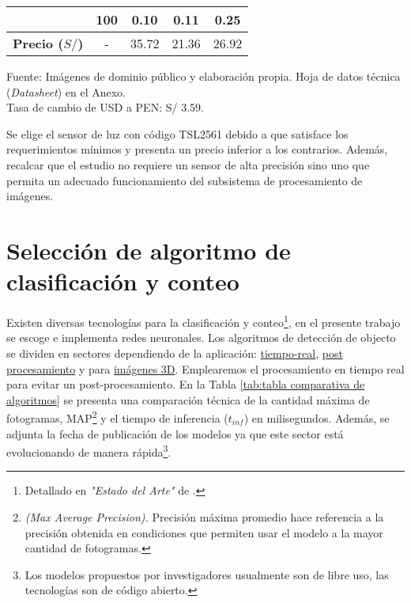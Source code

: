 \begin{savenotes}
\begin{mytable}[H]
\begin{tabular}{l|c|c|c|c|}
{			} & 100 & 0.10 & 0.11 & 0.25 \\ \hline
			\multicolumn{1}{|l|}{
				\begin{minipage}{\myforthmaxsizeofcontenttable}	
					\textbf{Precio ($S/$)}
				\end{minipage}
			} & - & 35.72 & 21.36 & 26.92 \\ \hline
		\end{tabular}
		\begin{myflushcenteraftertable}	
			Fuente: Imágenes de dominio público y elaboración propia. Hoja de datos técnica (\textit{Datasheet}) en el Anexo.\\
			Tasa de cambio de USD a PEN: S/ 3.59.
		\end{myflushcenteraftertable}
	\end{mytable}
\end{savenotes}

Se elige el sensor de luz con código TSL2561 debido a que satisface los requerimientos mínimos y presenta un precio inferior a los contrarios. Además, recalcar que el estudio no requiere un sensor de alta precisión sino uno que permita un adecuado funcionamiento del subsistema de procesamiento de imágenes.

\section{Selección de algoritmo de clasificación y conteo}
\label{sssec:seleccion de algoritmo de clasificacion y conteo}

Existen diversas tecnologías para la clasificación y conteo\footnote{Detallado en \textit{"Estado del Arte"} de \cite{DiazVergara2020}.}, en el presente trabajo se escoge e implementa redes neuronales. Los algoritmos de detección de objecto se dividen en sectores dependiendo de la aplicación: \href{https://paperswithcode.com/sota/real-time-object-detection-on-coco}{tiempo-real}, \href{https://paperswithcode.com/sota/object-detection-on-coco}{post procesamiento} y para \href{https://paperswithcode.com/sota/3d-object-detection-on-kitti-cars-moderate}{imágenes 3D}. Emplearemos el procesamiento en tiempo real para evitar un post-procesamiento. En la Tabla \ref{tab:tabla comparativa de algoritmos} se presenta una comparación técnica de la cantidad máxima de fotogramas, MAP\footnote{ \textit{(Max Average Precision).} Precisión máxima promedio hace referencia a la precisión obtenida en condiciones que permiten usar el modelo a la mayor cantidad de fotogramas.} y el tiempo de inferencia ($t_{inf}$) en milisegundos. Además, se adjunta la fecha de publicación de los modelos ya que este sector está evolucionando de manera rápida\footnote{Los modelos propuestos por investigadores usualmente son de libre uso, las tecnologías son de código abierto.}.

